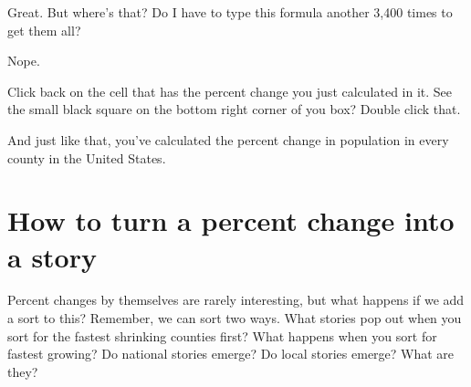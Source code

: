 \documentclass[
]{book}
\begin{document}
Great. But where's that? Do I have to type this formula another 3,400 times to get them all?

Nope.

Click back on the cell that has the percent change you just calculated in it. See the small black square on the bottom right corner of you box? Double click that.

And just like that, you've calculated the percent change in population in every county in the United States.

\hypertarget{how-to-turn-a-percent-change-into-a-story}{%
\section{How to turn a percent change into a story}\label{how-to-turn-a-percent-change-into-a-story}}

Percent changes by themselves are rarely interesting, but what happens if we add a sort to this? Remember, we can sort two ways. What stories pop out when you sort for the fastest shrinking counties first? What happens when you sort for fastest growing? Do national stories emerge? Do local stories emerge? What are they?
\end{document}
